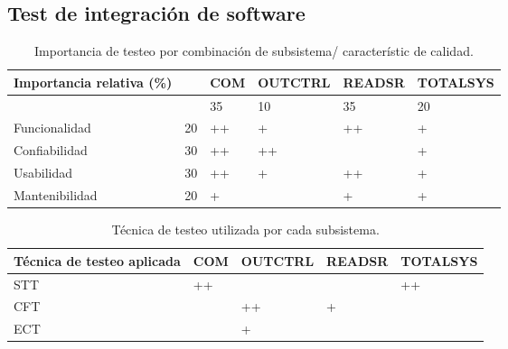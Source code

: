 \documentclass[12pt,a4paper, twosite]{article}
\begin{document}
\subsection{Test de integración de software}
\begin{table}[ht]
    \centering
    \begin{tabular}{|l|l|l|l|l|l|}\hline \hline
        Importancia relativa (\%) &    & COM & OUTCTRL & READSR & TOTALSYS \\
        \hline

                                  &    & 35  & 10      & 35     & 20       \\
        Funcionalidad             & 20 & ++  & +       & ++     & +        \\
        Confiabilidad             & 30 & ++  & ++      &        & +        \\
        Usabilidad                & 30 & ++  & +       & ++     & +        \\
        Mantenibilidad            & 20 & +   &         & +      & +        \\
        \hline
    \end{tabular}
    \caption{Importancia de testeo por combinación de subsistema/ característic
        de calidad.}
\end{table}

\begin{table}[ht]
    \centering
    \begin{tabular}{|l|l|l|l|l|}\hline \hline
        Técnica de testeo aplicada & COM & OUTCTRL & READSR & TOTALSYS \\
        \hline
        STT                        & ++  &         &        & ++       \\
        CFT                        &     & ++      & +      &          \\
        ECT                        &     & +       &        &          \\
        \hline
    \end{tabular}
    \caption{Técnica de testeo utilizada por cada subsistema.}
\end{table}
\end{document}
